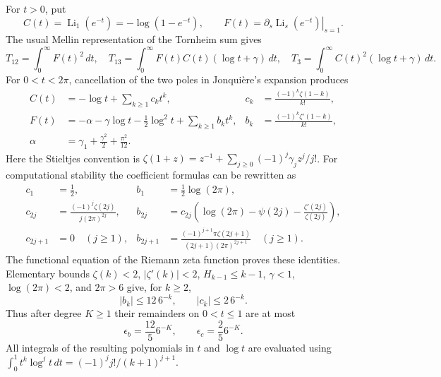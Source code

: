 For $t>0$, put
\[
 C(t)=\operatorname{Li}_1(e^{-t})=-\log(1-e^{-t}),\qquad
 F(t)=\left.\partial_s\operatorname{Li}_s(e^{-t})\right|_{s=1}.
\]
The usual Mellin representation of the Tornheim sum gives
\begin{equation}\label{tornheim:cubic:mellinpartials}
 T_{12}=\int_0^\infty F(t)^2\,dt,\quad
 T_{13}=\int_0^\infty F(t)C(t)(\log t+\gamma)\,dt,\quad
 T_3=\int_0^\infty C(t)^2(\log t+\gamma)\,dt.
\end{equation}
For $0<t<2\pi$, cancellation of the two poles in Jonqui\`ere's expansion
produces
\begin{align*}
 C(t)&=-\log t+\sum_{k\ge1}c_kt^k,
 &c_k&=\frac{(-1)^k\zeta(1-k)}{k!},\\
 F(t)&=-\alpha-\gamma\log t-\tfrac12\log^2t+\sum_{k\ge1}b_kt^k,
 &b_k&=\frac{(-1)^k\zeta'(1-k)}{k!},\\
 \alpha&=\gamma_1+\frac{\gamma^2}2+\frac{\pi^2}{12}.
\end{align*}
Here the Stieltjes convention is
$\zeta(1+z)=z^{-1}+\sum_{j\ge0}(-1)^j\gamma_jz^j/j!$.
For computational stability the coefficient formulas can be rewritten as
\begin{align*}
 c_1&=\tfrac12,&b_1&=\tfrac12\log(2\pi),\\
 c_{2j}&=\frac{(-1)^j\zeta(2j)}{j(2\pi)^{2j}},&
 b_{2j}&=c_{2j}\left(\log(2\pi)-\psi(2j)-\frac{\zeta'(2j)}{\zeta(2j)}\right),\\
 c_{2j+1}&=0\quad(j\ge1),&
 b_{2j+1}&=\frac{(-1)^{j+1}\pi\zeta(2j+1)}{(2j+1)(2\pi)^{2j+1}}
 \quad(j\ge1).
\end{align*}
The functional equation of the Riemann zeta function proves these identities.
Elementary bounds $\zeta(k)<2$, $|\zeta'(k)|<2$, $H_{k-1}\le k-1$,
$\gamma<1$, $\log(2\pi)<2$, and $2\pi>6$ give, for $k\ge2$,
\[
 |b_k|\le12\,6^{-k},\qquad |c_k|\le2\,6^{-k}.
\]
Thus after degree $K\ge1$ their remainders on $0<t\le1$ are at most
\[
 \epsilon_b=\frac{12}{5}6^{-K},\qquad
 \epsilon_c=\frac25 6^{-K}.
\]
All integrals of the resulting polynomials in $t$ and $\log t$ are evaluated
using $\int_0^1t^k\log^jt\,dt=(-1)^jj!/(k+1)^{j+1}$.


